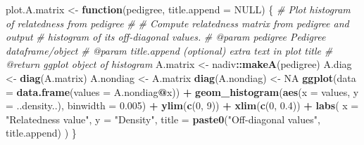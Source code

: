 \documentclass[
]{article}
\newenvironment{Shaded}{\begin{snugshade}}{\end{snugshade}}
\newcommand{\AttributeTok}[1]{\textcolor[rgb]{0.13,0.29,0.53}{#1}}
\newcommand{\CommentTok}[1]{\textcolor[rgb]{0.56,0.35,0.01}{\textit{#1}}}
\newcommand{\ConstantTok}[1]{\textcolor[rgb]{0.56,0.35,0.01}{#1}}
\newcommand{\ControlFlowTok}[1]{\textcolor[rgb]{0.13,0.29,0.53}{\textbf{#1}}}
\newcommand{\DecValTok}[1]{\textcolor[rgb]{0.00,0.00,0.81}{#1}}
\newcommand{\FloatTok}[1]{\textcolor[rgb]{0.00,0.00,0.81}{#1}}
\newcommand{\FunctionTok}[1]{\textcolor[rgb]{0.13,0.29,0.53}{\textbf{#1}}}
\newcommand{\NormalTok}[1]{#1}
\newcommand{\OtherTok}[1]{\textcolor[rgb]{0.56,0.35,0.01}{#1}}
\newcommand{\SpecialCharTok}[1]{\textcolor[rgb]{0.81,0.36,0.00}{\textbf{#1}}}
\newcommand{\StringTok}[1]{\textcolor[rgb]{0.31,0.60,0.02}{#1}}
\begin{document}
\begin{Shaded}
\begin{Highlighting}[]
\NormalTok{plot.A.matrix }\OtherTok{\textless{}{-}} \ControlFlowTok{function}\NormalTok{(pedigree, }\AttributeTok{title.append =} \ConstantTok{NULL}\NormalTok{) \{}
  \CommentTok{\#\textquotesingle{} Plot histogram of relatedness from pedigree}
  \CommentTok{\#\textquotesingle{}}
  \CommentTok{\#\textquotesingle{} Compute relatedness matrix from pedigree and output }
  \CommentTok{\#\textquotesingle{} histogram of its off{-}diagonal values.}
  \CommentTok{\#\textquotesingle{} @param pedigree Pedigree dataframe/object}
  \CommentTok{\#\textquotesingle{} @param title.append (optional) extra text in plot title}
  \CommentTok{\#\textquotesingle{} @return ggplot object of histogram}
\NormalTok{  A.matrix }\OtherTok{\textless{}{-}}\NormalTok{ nadiv}\SpecialCharTok{::}\FunctionTok{makeA}\NormalTok{(pedigree)}
\NormalTok{  A.diag }\OtherTok{\textless{}{-}} \FunctionTok{diag}\NormalTok{(A.matrix)}
\NormalTok{  A.nondiag }\OtherTok{\textless{}{-}}\NormalTok{ A.matrix}
  \FunctionTok{diag}\NormalTok{(A.nondiag) }\OtherTok{\textless{}{-}} \ConstantTok{NA}
  \FunctionTok{ggplot}\NormalTok{(}\AttributeTok{data =} \FunctionTok{data.frame}\NormalTok{(}\AttributeTok{values =}\NormalTok{ A.nondiag}\SpecialCharTok{@}\NormalTok{x)) }\SpecialCharTok{+}
    \FunctionTok{geom\_histogram}\NormalTok{(}\FunctionTok{aes}\NormalTok{(}\AttributeTok{x =}\NormalTok{ values, }\AttributeTok{y =}\NormalTok{ ..density..),}
                   \AttributeTok{binwidth =} \FloatTok{0.005}\NormalTok{) }\SpecialCharTok{+}
    \FunctionTok{ylim}\NormalTok{(}\FunctionTok{c}\NormalTok{(}\DecValTok{0}\NormalTok{, }\DecValTok{9}\NormalTok{)) }\SpecialCharTok{+}
    \FunctionTok{xlim}\NormalTok{(}\FunctionTok{c}\NormalTok{(}\DecValTok{0}\NormalTok{, }\FloatTok{0.4}\NormalTok{)) }\SpecialCharTok{+}
    \FunctionTok{labs}\NormalTok{(}
      \AttributeTok{x =} \StringTok{"Relatedness value"}\NormalTok{, }\AttributeTok{y =} \StringTok{"Density"}\NormalTok{,}
      \AttributeTok{title =} \FunctionTok{paste0}\NormalTok{(}\StringTok{"Off{-}diagonal values"}\NormalTok{, title.append)}
\NormalTok{    )}
\NormalTok{\}}


\end{Highlighting}
\end{Shaded}
\end{document}
